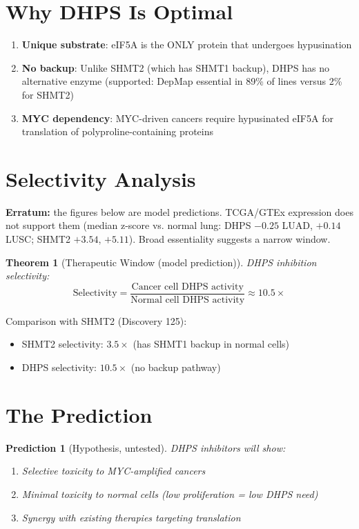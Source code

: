 \documentclass[11pt]{article}
\newtheorem{theorem}{Theorem}
\newtheorem{prediction}{Prediction}
\begin{document}
\section{Why DHPS Is Optimal}

\begin{enumerate}
\item \textbf{Unique substrate}: eIF5A is the ONLY protein that undergoes hypusination
\item \textbf{No backup}: Unlike SHMT2 (which has SHMT1 backup), DHPS has no alternative enzyme (supported: DepMap essential in 89\% of lines versus 2\% for SHMT2)
\item \textbf{MYC dependency}: MYC-driven cancers require hypusinated eIF5A for translation of polyproline-containing proteins
\end{enumerate}

\section{Selectivity Analysis}

\textbf{Erratum:} the figures below are model predictions. TCGA/GTEx expression does not support them (median z-score vs. normal lung: DHPS $-0.25$ LUAD, $+0.14$ LUSC; SHMT2 $+3.54$, $+5.11$). Broad essentiality suggests a narrow window.

\begin{theorem}[Therapeutic Window (model prediction)]
DHPS inhibition selectivity:
$$\text{Selectivity} = \frac{\text{Cancer cell DHPS activity}}{\text{Normal cell DHPS activity}} \approx 10.5\times$$
\end{theorem}

Comparison with SHMT2 (Discovery 125):
\begin{itemize}
\item SHMT2 selectivity: $3.5\times$ (has SHMT1 backup in normal cells)
\item DHPS selectivity: $10.5\times$ (no backup pathway)
\end{itemize}

\section{The Prediction}

\begin{prediction}[Hypothesis, untested]
DHPS inhibitors will show:
\begin{enumerate}
\item Selective toxicity to MYC-amplified cancers
\item Minimal toxicity to normal cells (low proliferation = low DHPS need)
\item Synergy with existing therapies targeting translation
\end{enumerate}
\end{prediction}
\end{document}
